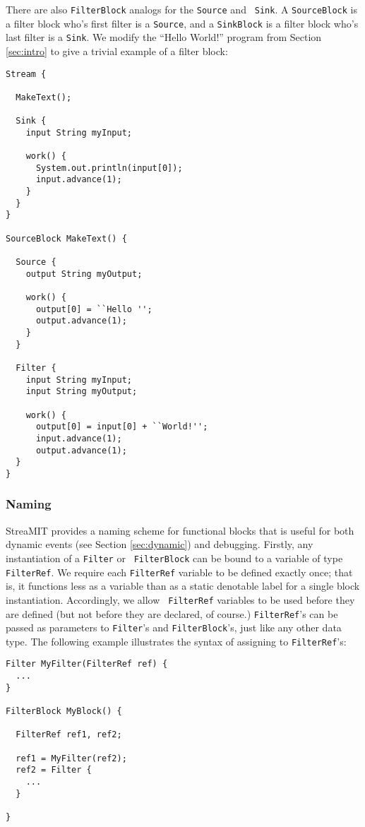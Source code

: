 \documentclass[draft]{article}
\begin{document}
There are also {\tt FilterBlock} analogs for the {\tt Source} and {\tt
Sink}.  A {\tt SourceBlock} is a filter block who's first filter is a
{\tt Source}, and a {\tt SinkBlock} is a filter block who's last
filter is a {\tt Sink}.  We modify the ``Hello World!''  program from
Section {\ref{sec:intro}} to give a trivial example of a filter block:

\begin{verbatim}
Stream {

  MakeText();

  Sink {
    input String myInput;
    
    work() {
      System.out.println(input[0]);
      input.advance(1);
    }
  }
}

SourceBlock MakeText() {

  Source {
    output String myOutput;

    work() {
      output[0] = ``Hello '';
      output.advance(1);
    }
  }

  Filter {
    input String myInput;
    input String myOutput;

    work() {
      output[0] = input[0] + ``World!'';
      input.advance(1);
      output.advance(1);
  }
}

\end{verbatim}

\subsubsection{Naming}

StreaMIT provides a naming scheme for functional blocks that is useful
for both dynamic events (see Section {\ref{sec:dynamic}}) and
debugging.  Firstly, any instantiation of a {\tt Filter} or {\tt
FilterBlock} can be bound to a variable of type {\tt FilterRef}.  We
require each {\tt FilterRef} variable to be defined exactly once; that
is, it functions less as a variable than as a static denotable label
for a single block instantiation.  Accordingly, we allow {\tt
FilterRef} variables to be used before they are defined (but not
before they are declared, of course.)  {\tt FilterRef}'s can be passed
as parameters to {\tt Filter}'s and {\tt FilterBlock}'s, just like any
other data type.  The following example illustrates the syntax of
assigning to {\tt FilterRef}'s:

\begin{verbatim}
Filter MyFilter(FilterRef ref) {
  ...
}

FilterBlock MyBlock() {

  FilterRef ref1, ref2;

  ref1 = MyFilter(ref2);
  ref2 = Filter {
    ...
  }

}
\end{verbatim}
\end{document}

